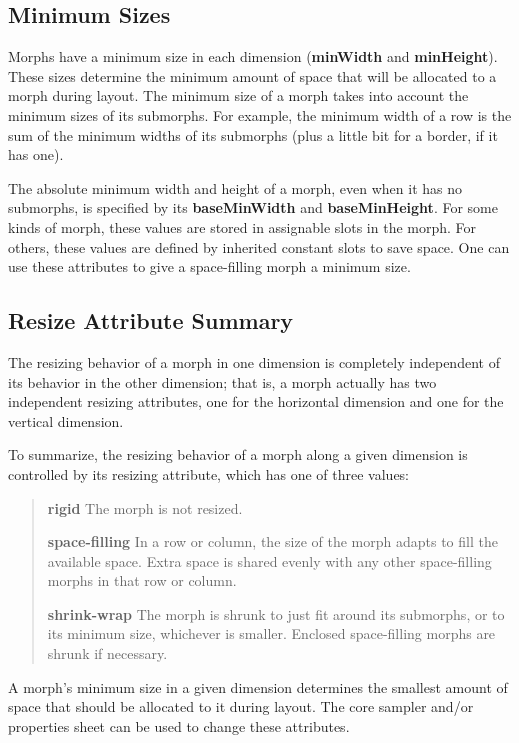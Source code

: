 \documentclass[letterpaper,10pt,english]{sphinxmanual}
\begin{document}
\subsection{Minimum Sizes}
\label{morphic:minimum-sizes}
Morphs have a minimum size in each dimension (\textbf{minWidth} and \textbf{minHeight}). These sizes determine the minimum amount of space that will be allocated to a morph during layout. The minimum size of a morph takes into account the minimum sizes of its submorphs. For example, the minimum width of a row is the sum of the minimum widths of its submorphs (plus a little bit for a border, if it has one).

The absolute minimum width and height of a morph, even when it has no submorphs, is specified by its \textbf{baseMinWidth} and \textbf{baseMinHeight}. For some kinds of morph, these values are stored in assignable slots in the morph. For others, these values are defined by inherited constant slots to save space. One can use these attributes to give a space-filling morph a minimum size.


\subsection{Resize Attribute Summary}
\label{morphic:resize-attribute-summary}
The resizing behavior of a morph in one dimension is completely independent of its behavior in the other dimension; that is, a morph actually has two independent resizing attributes, one for the horizontal dimension and one for the vertical dimension.

To summarize, the resizing behavior of a morph along a given dimension is controlled by its resizing attribute, which has one of three values:
\begin{quote}

\textbf{rigid} The morph is not resized.

\textbf{space-filling} In a row or column, the size of the morph adapts to fill the available space. Extra space is shared evenly with any other space-filling morphs in that row or column.

\textbf{shrink-wrap} The morph is shrunk to just fit around its submorphs, or to its minimum size, whichever is smaller. Enclosed space-filling morphs are shrunk if necessary.
\end{quote}

A morph's minimum size in a given dimension determines the smallest amount of space that should be allocated to it during layout. The core sampler and/or properties sheet can be used to change these attributes.
\end{document}

